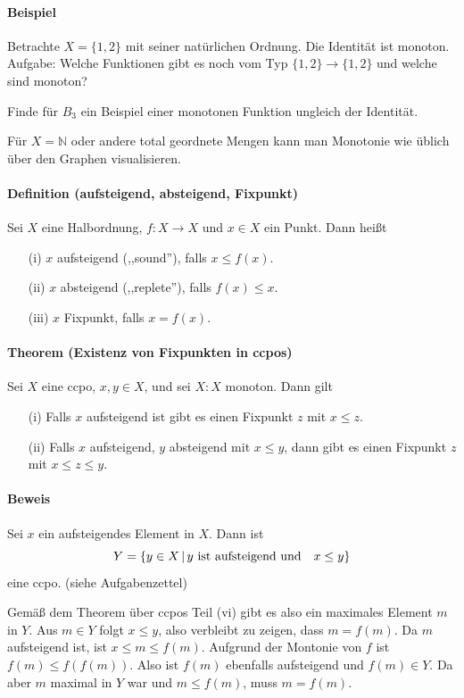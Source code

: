 \documentclass[a4paper,11pt,abstracton]{scrartcl}
\begin{document}
\paragraph{Beispiel} Betrachte $X =\{1,2\}$ mit seiner natürlichen Ordnung. Die Identität ist monoton. Aufgabe: Welche Funktionen gibt es noch vom Typ $\{1,2\} \to \{1,2\}$ und welche sind monoton?

Finde für $B_3$ ein Beispiel einer monotonen Funktion ungleich der Identität.

Für $X = \mathbb{N}$ oder andere total geordnete Mengen kann man Monotonie wie üblich über den Graphen visualisieren.

\paragraph{Definition (aufsteigend, absteigend, Fixpunkt)} Sei $X$ eine Halbordnung, $f\colon X \to X$ und $x \in X$ ein Punkt. Dann heißt
\begin{enumerate}
 \item[(i)] $x$ aufsteigend (,,sound''), falls $x \leq f(x)$.
 \item[(ii)] $x$ absteigend (,,replete''), falls $f(x) \leq x$.
 \item[(iii)] $x$ Fixpunkt, falls $x = f(x)$.
\end{enumerate}
\paragraph{Theorem (Existenz von Fixpunkten in ccpos)} Sei $X$ eine ccpo, $x,y \in X$, und sei $X\colon X$ monoton. Dann gilt
\begin{enumerate}
 \item[(i)] Falls $x$ aufsteigend ist gibt es einen Fixpunkt $z$ mit $x \leq z$.
 \item[(ii)] Falls $x$ aufsteigend, $y$ absteigend mit $x \leq y$, dann gibt es einen Fixpunkt $z$ mit $x \leq z \leq y$.
\end{enumerate}
\paragraph{Beweis} Sei $x$ ein aufsteigendes Element in $X$. Dann ist
\begin{equation}
 Y = \{ y \in X \, | \, y \textnormal{ ist aufsteigend und}\quad x \leq y \}
\end{equation}
eine ccpo. (siehe Aufgabenzettel)

Gemäß dem Theorem über ccpos Teil (vi) gibt es also ein maximales Element $m$ in $Y$. Aus $m \in Y$ folgt $x \leq y$, also verbleibt zu zeigen, dass $m = f(m)$. Da $m$ aufsteigend ist, ist $x \leq m \leq f(m)$. Aufgrund der Montonie von $f$ ist $f(m) \leq f(f(m))$. Also ist $f(m)$ ebenfalls aufsteigend und $f(m) \in Y$. Da aber $m$ maximal in $Y$ war und $m \leq f(m)$, muss $m = f(m)$.
\end{document}
